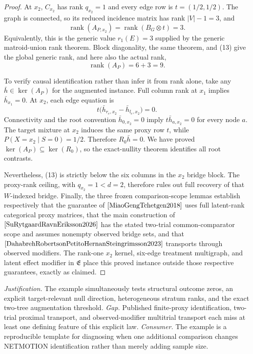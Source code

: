 \documentclass{article}
\begin{document}
\begin{proof}
At \(x_2\), \(C_{x_2}\) has rank \(q_{x_2}=1\) and every edge row is \(t=(1/2,1/2)\).  The graph is connected, so its reduced incidence matrix has rank \(|V|-1=3\), and
\[
\operatorname{rank}(A_{P,x_2})
=\operatorname{rank}(B_G\otimes t)
=3.
\tag{13}
\]
Equivalently, this is the generic value \(r_1(E)=3\) supplied by the generic matroid-union rank theorem.  Block diagonality, the same theorem, and (13) give the global generic rank, and here also the actual rank,
\[
\operatorname{rank}(A_P)=6+3=9.
\tag{14}
\]

To verify causal identification rather than infer it from rank alone, take any \(\bar h\in\ker(A_P)\) for the augmented instance.  Full column rank at \(x_1\) implies \(\bar h_{x_1}=0\).  At \(x_2\), each edge equation is
\[
t\bigl(\bar h_{r_e,x_2}-\bar h_{l_e,x_2}\bigr)=0.
\]
Connectivity and the root convention \(\bar h_{0,x_2}=0\) imply \(t\bar h_{a,x_2}=0\) for every node \(a\).  The target mixture at \(x_2\) induces the same proxy row \(t\), while \(P(X=x_2\mid S=0)=1/2\).  Therefore \(R_0\bar h=0\).  We have proved \(\ker(A_P)\subseteq\ker(R_0)\), so the exact-nullity theorem identifies all root contrasts.

Nevertheless, (13) is strictly below the six columns in the \(x_2\) bridge block.  The proxy-rank ceiling, with \(q_{x_2}=1<d=2\), therefore rules out full recovery of that \(W\)-indexed bridge.  Finally, the three frozen comparison-scope lemmas establish respectively that the guarantee of \(\cite{MiaoGengTchetgen2018}\) uses full latent-rank categorical proxy matrices, that the main construction of \(\cite{SuRytgaardRavnEriksson2026}\) has the stated two-trial common-comparator scope and assumes nonempty observed bridge sets, and that \(\cite{DahabrehRobertsonPetitoHernanSteingrimsson2023}\) transports through observed modifiers.  The rank-one \(x_2\) kernel, six-edge treatment multigraph, and latent effect modifier in \(\mathfrak E\) place this proved instance outside those respective guarantees, exactly as claimed.
\end{proof}
\par\smallskip\noindent \textit{Justification.} The example simultaneously tests structural outcome zeros, an explicit target-relevant null direction, heterogeneous stratum ranks, and the exact two-tree augmentation threshold. \textit{Gap.} Published finite-proxy identification, two-trial proximal transport, and observed-modifier multitrial transport each miss at least one defining feature of this explicit law. \textit{Consumer.} The example is a reproducible template for diagnosing when one additional comparison changes NETMOTION identification rather than merely adding sample size.
\end{document}
